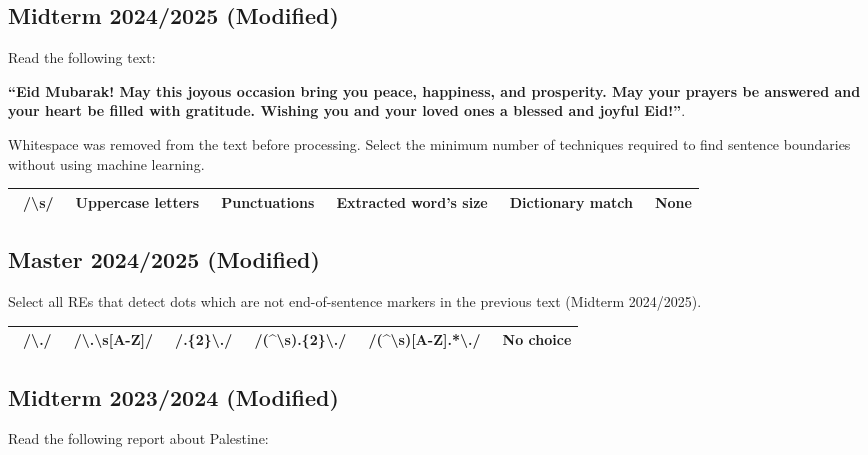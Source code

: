 \documentclass{../extra/aakpract/aakpract}
\begin{document}
	\subsection{Midterm 2024/2025 (Modified)}
	
	Read the following text:
	
	\textbf{``Eid Mubarak! May this joyous occasion bring you peace, happiness, and prosperity. May your prayers be answered and your heart be filled with gratitude. Wishing you and your loved ones a blessed and joyful Eid!''}.
	
	Whitespace was removed from the text before processing. 
	Select the minimum number of techniques required to find sentence boundaries without using machine learning.
	\begin{center}
		\begin{tabular}{|llllll|}
			\hline
			\Square\ /\textbackslash s/ & 
			\Square\ Uppercase letters & 
			\Square\ Punctuations & 
			\Square\ Extracted word's size &
			\Square\ Dictionary match &
			\Circle\ None \\
			\hline
		\end{tabular}
	\end{center}
	
	
	\subsection{Master 2024/2025 (Modified)}
	
	Select all REs that detect dots which are not end-of-sentence markers in the previous text (Midterm 2024/2025).
	\begin{center}
		\begin{tabular}{|llllll|}
			\hline
			\Square\ /\textbackslash ./ & 
			\Square\ /\textbackslash.\textbackslash s[A-Z]/ & 
			\Square\ /.\{2\}\textbackslash./ & 
			\Square\ /(\textasciicircum\textbar\textbackslash s).\{2\}\textbackslash./ &
			\Square\ /(\textasciicircum\textbar\textbackslash s)[A-Z].*\textbackslash./ &
			\Circle\ No choice \\
			\hline
		\end{tabular}
	\end{center}
	
	
	\newpage
	\subsection{Midterm 2023/2024 (Modified)}
	
	Read the following report about Palestine:
	
\end{document}
